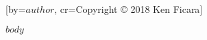 \documentclass{article}
\begin{document}
\renewcommand{\printchord}[1]{\rmfamily\bf#1}

 \nosongnumbers
 

\begin{songs}{}
[by={$author$},
                     cr={Copyright © 2018 Ken Ficara}]

$body$

\endsong
\end{songs}
\end{document}
